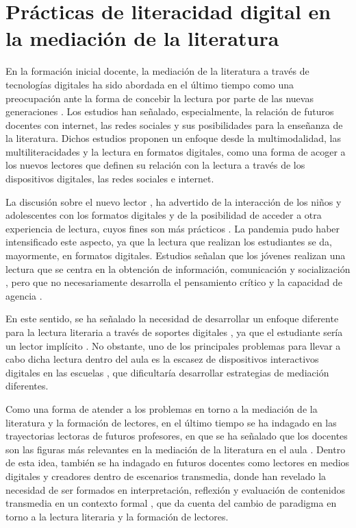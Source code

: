 \section{Prácticas de literacidad digital en la mediación de la
	literatura}\label{prácticasdeliteracidad}
	
	En la formación inicial docente, la mediación de la literatura a través
	de tecnologías digitales ha sido abordada en el último tiempo como una
	preocupación ante la forma de concebir la lectura por parte de las
	nuevas generaciones \cite{contrereasbarcelo2023,gonzalez_2016,rovira-collado2021}. Los estudios han señalado,
	especialmente, la relación de futuros docentes con internet, las redes
	sociales y sus posibilidades para la enseñanza de la literatura. Dichos
	estudios proponen un enfoque desde la multimodalidad, las
	multiliteracidades y la lectura en formatos digitales, como una forma de
	acoger a los nuevos lectores que definen su relación con la lectura a
	través de los dispositivos digitales, las redes sociales e internet.
	
	La discusión sobre el nuevo lector \cite{cerrillo2005,lluch_2010_new,montesa_et_al_2010}, ha advertido de la interacción de los
	niños y adolescentes con los formatos digitales y de la posibilidad de
	acceder a otra experiencia de lectura, cuyos fines son más prácticos
	\cite{oecd_2019b}. La pandemia pudo haber intensificado este aspecto, ya que
	la lectura que realizan los estudiantes se da, mayormente, en formatos
	digitales. Estudios señalan que los jóvenes realizan una lectura que se
	centra en la obtención de información, comunicación y socialización
	\cite{Valdivia_Brossi_Cabalin_Pinto_2019}, pero que no necesariamente desarrolla el
	pensamiento crítico y la capacidad de agencia \cite{cabero-almenara_valencia-ortiz_llorente-cejudo_palacios-rodríguez_2023}.

En este sentido, se ha señalado la necesidad de desarrollar un enfoque diferente para la lectura literaria a través de soportes digitales \cite{cordongarcias2015,garciaroca2016practicas}, ya que el estudiante sería un lector implícito \cite{turreonpenelas2014}. No obstante, uno de los principales problemas para llevar a cabo dicha lectura dentro del aula es la escasez de dispositivos interactivos digitales en las escuelas \cite{ramadaprietoturrion2019}, que dificultaría desarrollar estrategias de mediación diferentes.
	
Como una forma de atender a los problemas en torno a la mediación de la
literatura y la formación de lectores, en el último tiempo se ha
indagado en las trayectorias lectoras de futuros profesores, en que se
ha señalado que los docentes son las figuras más relevantes en la
mediación de la literatura en el aula \cite{contrerasbarcelo2021}. Dentro
de esta idea, también se ha indagado en futuros docentes como lectores
en medios digitales y creadores dentro de escenarios transmedia, donde
han revelado la necesidad de ser formados en interpretación, reflexión y
evaluación de contenidos transmedia en un contexto formal \cite{contrereasbarcelo2023}, que da cuenta del cambio de paradigma en
torno a la lectura literaria y la formación de lectores.
	
